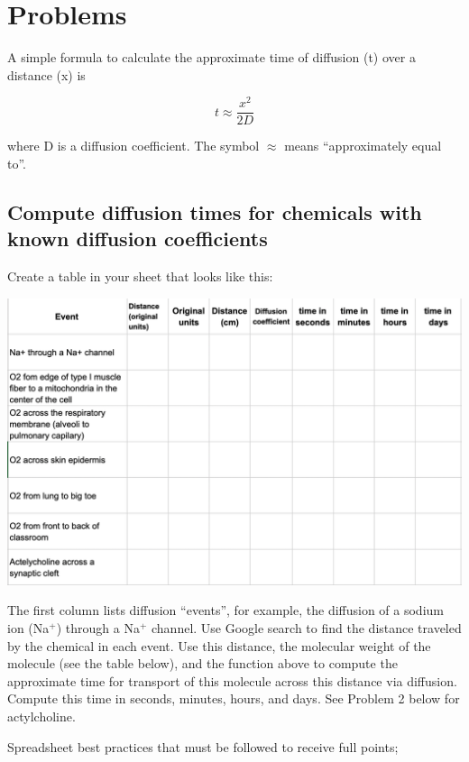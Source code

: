 \documentclass[]{book}
\begin{document}
\section{Problems}\label{problems}

A simple formula to calculate the approximate time of diffusion (t) over
a distance (x) is

\begin{equation}
t \approx \frac{x^2}{2D}
\end{equation}

where D is a diffusion coefficient. The symbol \(\approx\) means
``approximately equal to''.

\subsection{Compute diffusion times for chemicals with known diffusion
coefficients}\label{compute-diffusion-times-for-chemicals-with-known-diffusion-coefficients}

Create a table in your sheet that looks like this:

\begin{center}\includegraphics[width=0.6\linewidth]{images/diffusion_table} \end{center}

The first column lists diffusion ``events'', for example, the diffusion
of a sodium ion (Na\(^+\)) through a Na\(^+\) channel. Use Google search
to find the distance traveled by the chemical in each event. Use this
distance, the molecular weight of the molecule (see the table below),
and the function above to compute the approximate time for transport of
this molecule across this distance via diffusion. Compute this time in
seconds, minutes, hours, and days. See Problem 2 below for actylcholine.

Spreadsheet best practices that must be followed to receive full points;
\end{document}
